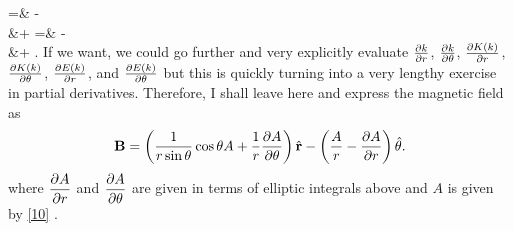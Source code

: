 \documentclass[11pt,letterpaper]{article}
\begin{document}
	\ba
		\pdiff[A]{\theta} =& -\\
		&\quad +  \pdiff{\theta}
	\ea
	\ba
		 =& -\\
		&\quad +  .
	\ea
	If we want, we could go further and very explicitly evaluate $\pdiff[k]{r}$, $\pdiff[k]{\theta}$, $\pdiff[K(k)]{r}$, $\pdiff[K(k)]{\theta}$, 
	$\pdiff[E(k)]{r}$, and $\pdiff[E(k)]{\theta}$ but this is quickly turning into a very lengthy exercise in partial derivatives. Therefore, 
	I shall leave here and express the magnetic field as
	\[
		\vect B =\plr{\frac{1}{r\sin\theta}\cos\theta A+\frac{1}{r}\pdiff[A]{\theta}}\vecth r -\plr{\frac{A}{r}-\pdiff[A]{r}}\vecth\theta.
	\] 
	where $\ds\pdiff[A]{r}$ and $\ds\pdiff[A]{\theta}$ are given in terms of elliptic integrals above and $A$ is given by \eqref{10} . 
		
\eenum
\end{document}

